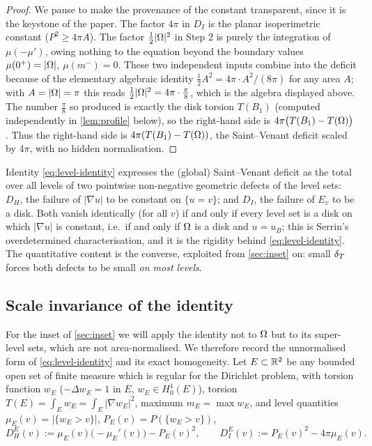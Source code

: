 \begin{proof}
We pause to make the provenance of the constant transparent, since it is the
keystone of the paper. The factor $4\pi$ in $D_I$ is the planar isoperimetric
constant ($P^2\ge4\pi A$). The factor $\tfrac12|\Omega|^2$ in Step 2 is purely
the integration of $\mu(-\mu')$, owing nothing to the equation beyond the
boundary values $\mu(0^+)=|\Omega|$, $\mu(m^-)=0$. These two independent inputs
combine into the deficit because of the elementary algebraic identity
$\tfrac12 A^2=4\pi\cdot A^2/(8\pi)$ for any area $A$; with $A=|\Omega|=\pi$ this
reads $\tfrac12|\Omega|^2=4\pi\cdot\tfrac\pi8$, which is the algebra displayed
above. The number $\tfrac\pi8$ so produced is exactly the disk torsion
$T(B_1)$ (computed independently in \cref{lem:profile} below), so the
right-hand side is $4\pi\bigl(T(B_1)-T(\Omega)\bigr)$. Thus
the right-hand side is $4\pi(T(B_1)-T(\Omega))$, the Saint--Venant deficit
scaled by $4\pi$, with no hidden normalisation.
\end{proof}

\begin{remark}\label{rem:identity}
Identity \eqref{eq:level-identity} expresses the (global) Saint--Venant
deficit as the total over all levels of two pointwise non-negative geometric
defects of the level sets: $D_H$, the failure of $|\nabla u|$ to be constant
on $\{u=v\}$; and $D_I$, the failure of $E_v$ to be a disk. Both vanish
identically (for all $v$) if and only if every level set is a disk on which
$|\nabla u|$ is constant, i.e.\ if and only if $\Omega$ is a disk and $u=u_B$;
this is Serrin's overdetermined characterisation, and it is the rigidity
behind \eqref{eq:level-identity}. The quantitative content is the converse,
exploited from \cref{sec:inset} on: small $\delta_T$ forces both defects to be
small \emph{on most levels}.
\end{remark}

\subsection{Scale invariance of the identity}

For the inset of \cref{sec:inset} we will apply the identity not to $\Omega$ but
to its super-level sets, which are not area-normalised. We therefore record
the unnormalised form of \eqref{eq:level-identity} and its exact
homogeneity. Let $E\subset\mathbb{R}^2$ be any bounded open set of finite measure
which is regular for the Dirichlet problem, with torsion function $w_E$
($-\Delta w_E=1$ in $E$, $w_E\in H^1_0(E)$), torsion
$T(E)=\int_E w_E=\int_E|\nabla w_E|^2$, maximum $m_E=\max w_E$, and level
quantities $\mu_E(v)=|\{w_E>v\}|$, $P_E(v)=P(\{w_E>v\})$,
\[
   D_H^E(v):=\mu_E(v)\bigl(-\mu_E'(v)\bigr)-P_E(v)^2,
   \qquad
   D_I^E(v):=P_E(v)^2-4\pi\mu_E(v).
\]

